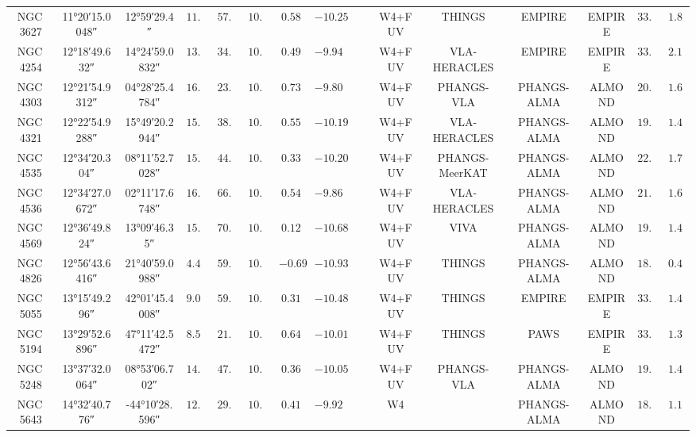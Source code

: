 \documentclass[letter, longauth]{aa} %
\newcommand*{\ra}[2][]{{
		\ang[
		angle-symbol-degree=\textsuperscript{h},
		angle-symbol-minute=\textsuperscript{m},
		angle-symbol-second=\textsuperscript{s},
		#1]{#2}%
}}
\newcommand{\cmark}{\textcolor{green}{\ding{51}}}
\newcommand{\xmark}{\textcolor{red}{\ding{55}}}
\begin{document}
\begin{appendix}
\begin{table}
\begin{center}
{\begin{tabular}{cccccccccccccccc}
NGC\,3627 & \ra{11;20;15.0048} & \ang{+12;59;29.4} & $11.32$ & $57.30$ & $10.83$ & $0.58$ & $-10.25$ & \cmark & \cmark & W4+FUV & THINGS & EMPIRE & EMPIRE & $33.30$ & $1.83$ \\
NGC\,4254 & \ra{12;18;49.632} & \ang{+14;24;59.0832} & $13.10$ & $34.40$ & $10.42$ & $0.49$ & $-9.94$ & \xmark & \xmark & W4+FUV & VLA-HERACLES & EMPIRE & EMPIRE & $33.30$ & $2.11$ \\
NGC\,4303 & \ra{12;21;54.9312} & \ang{+04;28;25.4784} & $16.99$ & $23.50$ & $10.52$ & $0.73$ & $-9.80$ & \cmark & \cmark & W4+FUV & PHANGS-VLA & PHANGS-ALMA & ALMOND & $20.20$ & $1.66$ \\
NGC\,4321 & \ra{12;22;54.9288} & \ang{+15;49;20.2944} & $15.21$ & $38.50$ & $10.75$ & $0.55$ & $-10.19$ & \cmark & \xmark & W4+FUV & VLA-HERACLES & PHANGS-ALMA & ALMOND & $19.60$ & $1.45$ \\
NGC\,4535 & \ra{12;34;20.304} & \ang{+08;11;52.7028} & $15.77$ & $44.70$ & $10.53$ & $0.33$ & $-10.20$ & \cmark & \xmark & W4+FUV & PHANGS-MeerKAT & PHANGS-ALMA & ALMOND & $22.80$ & $1.74$ \\
NGC\,4536 & \ra{12;34;27.0672} & \ang{+02;11;17.6748} & $16.25$ & $66.00$ & $10.40$ & $0.54$ & $-9.86$ & \cmark & \xmark & W4+FUV & VLA-HERACLES & PHANGS-ALMA & ALMOND & $21.50$ & $1.69$ \\
NGC\,4569 & \ra{12;36;49.824} & \ang{+13;09;46.35} & $15.76$ & $70.00$ & $10.81$ & $0.12$ & $-10.68$ & \cmark & \cmark & W4+FUV & VIVA & PHANGS-ALMA & ALMOND & $19.20$ & $1.47$ \\
NGC\,4826 & \ra{12;56;43.6416} & \ang{+21;40;59.0988} & $4.41$ & $59.10$ & $10.24$ & $-0.69$ & $-10.93$ & \xmark & \cmark & W4+FUV & THINGS & PHANGS-ALMA & ALMOND & $18.70$ & $0.40$ \\
NGC\,5055 & \ra{13;15;49.296} & \ang{+42;01;45.4008} & $9.02$ & $59.00$ & $10.79$ & $0.31$ & $-10.48$ & \xmark & \xmark & W4+FUV & THINGS & EMPIRE & EMPIRE & $33.30$ & $1.46$ \\
NGC\,5194 & \ra{13;29;52.6896} & \ang{+47;11;42.5472} & $8.56$ & $21.00$ & $10.65$ & $0.64$ & $-10.01$ & \xmark & \cmark & W4+FUV & THINGS & PAWS & EMPIRE & $33.30$ & $1.38$ \\
NGC\,5248 & \ra{13;37;32.0064} & \ang{+08;53;06.702} & $14.87$ & $47.40$ & $10.41$ & $0.36$ & $-10.05$ & \cmark & \xmark & W4+FUV & PHANGS-VLA & PHANGS-ALMA & ALMOND & $19.90$ & $1.43$ \\
NGC\,5643 & \ra{14;32;40.776} & \ang{-44;10;28.596} & $12.68$ & $29.90$ & $10.34$ & $0.41$ & $-9.92$ & \cmark & \cmark & W4 & \xmark & PHANGS-ALMA & ALMOND & $18.00$ & $1.11$ \\

\end{tabular}}
\end{center}
\end{table}
\end{appendix}
\end{document}
